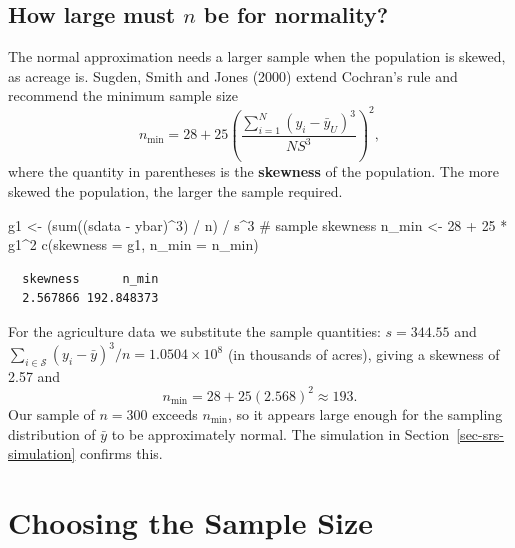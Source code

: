 \documentclass[
  letterpaper,
  DIV=11,
  numbers=noendperiod]{scrreprt}
\newenvironment{Shaded}{\begin{snugshade}}{\end{snugshade}}
\newcommand{\AttributeTok}[1]{\textcolor[rgb]{0.40,0.45,0.13}{#1}}
\newcommand{\CommentTok}[1]{\textcolor[rgb]{0.37,0.37,0.37}{#1}}
\newcommand{\DecValTok}[1]{\textcolor[rgb]{0.68,0.00,0.00}{#1}}
\newcommand{\FunctionTok}[1]{\textcolor[rgb]{0.28,0.35,0.67}{#1}}
\newcommand{\NormalTok}[1]{\textcolor[rgb]{0.00,0.23,0.31}{#1}}
\newcommand{\OtherTok}[1]{\textcolor[rgb]{0.00,0.23,0.31}{#1}}
\newcommand{\SpecialCharTok}[1]{\textcolor[rgb]{0.37,0.37,0.37}{#1}}
\renewcommand{\[}{\begin{equation}}
\renewcommand{\]}{\end{equation}}
\begin{document}
\subsection{\texorpdfstring{How large must \(n\) be for
normality?}{How large must n be for normality?}}\label{how-large-must-n-be-for-normality}

The normal approximation needs a larger sample when the population is
skewed, as acreage is. Sugden, Smith and Jones (2000) extend Cochran's
rule and recommend the minimum sample size \[
n_{\min} = 28 + 25\left(\frac{\sum_{i=1}^N (y_i-\bar y_{U})^3}{N S^3}\right)^{\!2},
\] where the quantity in parentheses is the \textbf{skewness} of the
population. The more skewed the population, the larger the sample
required.

\begin{Shaded}
\begin{Highlighting}[]
\NormalTok{g1 }\OtherTok{\textless{}{-}}\NormalTok{ (}\FunctionTok{sum}\NormalTok{((sdata }\SpecialCharTok{{-}}\NormalTok{ ybar)}\SpecialCharTok{\^{}}\DecValTok{3}\NormalTok{) }\SpecialCharTok{/}\NormalTok{ n) }\SpecialCharTok{/}\NormalTok{ s}\SpecialCharTok{\^{}}\DecValTok{3}   \CommentTok{\# sample skewness}
\NormalTok{n\_min }\OtherTok{\textless{}{-}} \DecValTok{28} \SpecialCharTok{+} \DecValTok{25} \SpecialCharTok{*}\NormalTok{ g1}\SpecialCharTok{\^{}}\DecValTok{2}
\FunctionTok{c}\NormalTok{(}\AttributeTok{skewness =}\NormalTok{ g1, }\AttributeTok{n\_min =}\NormalTok{ n\_min)}
\end{Highlighting}
\end{Shaded}

\begin{verbatim}
  skewness      n_min 
  2.567866 192.848373 
\end{verbatim}

For the agriculture data we substitute the sample quantities:
\(s = 344.55\) and
\(\sum_{i\in\mathcal S}(y_i-\bar y)^3/n = 1.0504 \times 10^{8}\) (in
thousands of acres), giving a skewness of 2.57 and \[
n_{\min} = 28 + 25(2.568)^2 \approx 193 .
\] Our sample of \(n=300\) exceeds \(n_{\min}\), so it appears large
enough for the sampling distribution of \(\bar y\) to be approximately
normal. The simulation in Section~\ref{sec-srs-simulation} confirms
this.

\section{Choosing the Sample Size}\label{sec-srs-sample-size}
\end{document}
